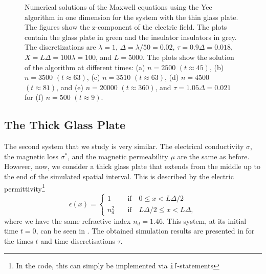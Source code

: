 \documentclass[11pt, A4paper]{article}
\begin{document}
\begin{figure}[h!]
\begin{subfigure}[h]{0.499\textwidth}
         \caption{}
         \label{fig: thin_t10_tau105}
     \end{subfigure}
\caption{Numerical solutions of the Maxwell equations using the Yee algorithm in one dimension for the system with the thin glass plate. The figures show the z-component of the electric field. The plots contain the glass plate in green and the insulator insulators in grey. The discretizations are $\lambda=1$, $\Delta=\lambda/50=0.02$, $\tau=0.9 \Delta=0.018$, $X=L\Delta=100 \lambda=100$, and $L=5000$. The plots show the solution of the algorithm at different times: (a) $n=2500$ $(t\approx 45)$, (b) $n=3500$ $(t\approx 63)$, (c) $n=3510$ $(t\approx 63)$, (d) $n=4500$ $(t\approx 81)$, and (e) $n=20000$ $(t\approx360)$, and $\tau=1.05 \Delta=0.021$ for (f) $n=500$ $(t\approx 9)$.}
\label{fig: Maxwell_thin}
\end{figure}
\clearpage

\subsection{The Thick Glass Plate}
The second system that we study is very similar. The electrical conductivity $\sigma$, the magnetic loss $\sigma^*$, and the magnetic permeability $\mu$ are the same as before. However, now, we consider a thick glass plate that extends from the middle up to the end of the simulated spatial interval. This is described by the electric permittivity\footnote{In the code, this can simply be implemented via \texttt{if}-statements}
\begin{equation}
    \epsilon (x)=
    \begin{cases}
        1       &\quad \text{if} \quad 0 \leq x < L \Delta/2 \\
        n_d^2   &\quad \text{if} \quad L \Delta/2 \leq x < L \Delta,
    \end{cases}
    \label{eq: eps thick}
\end{equation}
where we have the same refractive index $n_d=1.46$. This system, at its initial time $t=0$, can be seen in . The obtained simulation results are presented in  for the times $t$ and time discretisations $\tau$. \\
\end{document}
